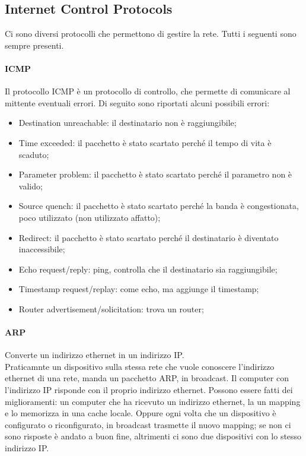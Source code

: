 \documentclass{article}
\begin{document}
\subsection{Internet Control Protocols}
Ci sono diversi protocolli che permettono di gestire la rete. Tutti i seguenti
sono sempre presenti.

\paragraph{ICMP}
Il protocollo ICMP è un protocollo di controllo, che permette di comunicare
al mittente eventuali errori. Di seguito sono riportati alcuni possibili errori:
\begin{itemize}
	\item Destination unreachable: il destinatario non è raggiungibile;

	\item Time exceeded: il pacchetto è stato scartato perché il tempo di vita
		è scaduto;

	\item Parameter problem: il pacchetto è stato scartato perché il parametro
		non è valido;

	\item Source quench: il pacchetto è stato scartato perché la banda è
		congestionata, poco utilizzato (non utilizzato affatto);

	\item Redirect: il pacchetto è stato scartato perché il destinatario è
		diventato inaccessibile;

	\item Echo request/reply: ping, controlla che il destinatario sia 
		raggiungibile;

	\item Timestamp request/replay: come echo, ma aggiunge il timestamp;

	\item Router advertisement/solicitation: trova un router;
\end{itemize}

\paragraph{ARP}
Converte un indirizzo ethernet in un indirizzo IP.\\
Praticamnte un dispositivo sulla stessa rete che vuole conoscere l'indirizzo
ethernet di una rete, manda un pacchetto ARP, in broadcast. Il computer con
l'indirizzo IP risponde con il proprio indirizzo ethernet. Possono essere fatti
dei miglioramenti: un computer che ha ricevuto un indirizzo ethernet, la un
mapping e lo memorizza in una cache locale. Oppure ogni volta che un dispositivo
è configurato o riconfigurato, in broadcast trasmette il nuovo mapping; se non
ci sono risposte è andato a buon fine, altrimenti ci sono due dispositivi con
lo stesso indirizzo IP.\\
\end{document}
